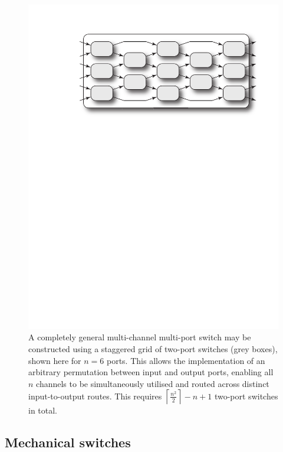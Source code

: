 \documentclass[aps, rmp, twocolumn, amsmath, amssymb, nofootinbib, superscriptaddress, longbibliography, floatfix, table-of-contents, eqsecnum]{revtex4-1}
\begin{document}
\begin{figure}[!htb]
\includegraphics[width=\columnwidth]{multi_channel_multi_port_switch}
\caption{A completely general multi-channel multi-port switch may be constructed using a staggered grid of two-port switches (grey boxes), shown here for \mbox{$n=6$} ports. This allows the implementation of an arbitrary permutation between input and output ports, enabling all $n$ channels to be simultaneously utilised and routed across distinct input-to-output routes. This requires \mbox{$\left\lceil \frac{n^2}{2}\right\rceil - n + 1$} two-port switches in total.} \label{fig:multi_channel_multi_port_switch} 	
\end{figure}

%
%

\subsection{Mechanical switches}
\end{document}
